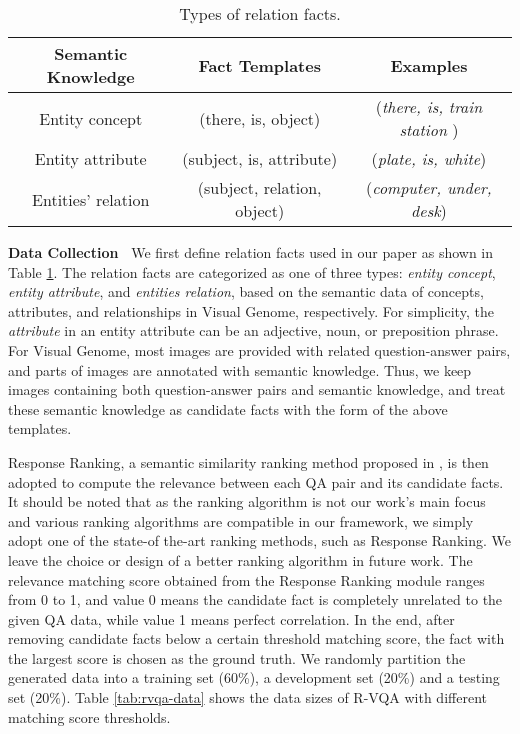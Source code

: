 \documentclass[sigconf]{acmart}
\begin{document}
\begin{table}[h]
	\centering 
\footnotesize
	\begin{tabular}{*3{c}} 
		\toprule	
		Semantic Knowledge				& Fact Templates	 		& Examples   \\
		\midrule
		Entity concept	& (there, is, object)	 			& (\textit{there, is, train station} )  \\
		Entity attribute	& (subject, is, attribute)	 		& (\textit{plate, is, white})   \\
		Entities' relation  & (subject, relation, object)	 	& (\textit{computer, under, desk})  \\
		\bottomrule		
	\end{tabular}
	\caption{Types of relation facts.}
	\label{tab:rvqa-triplet}
\end{table}





\textbf{Data Collection~}  We first define relation facts used in our paper as shown in Table \ref{tab:rvqa-triplet}.
The  relation facts are categorized as one of three types:
\textit{entity concept}, \textit{entity attribute}, and \textit{entities relation},
based on the semantic data of concepts, attributes, and relationships in Visual Genome, respectively.
For simplicity, the \textit{attribute} in an entity attribute can be an adjective, noun, or preposition phrase.
For Visual Genome, most images are provided with related question-answer pairs, and parts of images are annotated with semantic knowledge.
Thus, we keep images containing both question-answer pairs and semantic knowledge,
and treat these semantic knowledge as candidate facts with the form of the above templates.


Response Ranking, a semantic similarity ranking method proposed in \cite{yan2016docchat}, 
is then adopted to compute the relevance between each QA pair and its candidate facts.
It should be noted that as the ranking algorithm is not our work's main focus and various ranking algorithms are compatible in our framework, we simply adopt one of the state-of the-art ranking methods, such as Response Ranking. We leave the choice or design of a better ranking algorithm in future work.
The relevance matching score obtained from the Response Ranking module ranges from 0 to 1, and value 0 means the candidate fact is
completely unrelated to the given QA data, while value 1 means perfect correlation.
In the end, after removing candidate facts below a certain threshold matching score,
the fact with the largest score is chosen as the ground truth.
We randomly partition the generated data into a training set (60\%), a development set (20\%) and a testing set (20\%).
Table \ref{tab:rvqa-data} shows the data sizes of R-VQA with different matching score thresholds.
\end{document}
